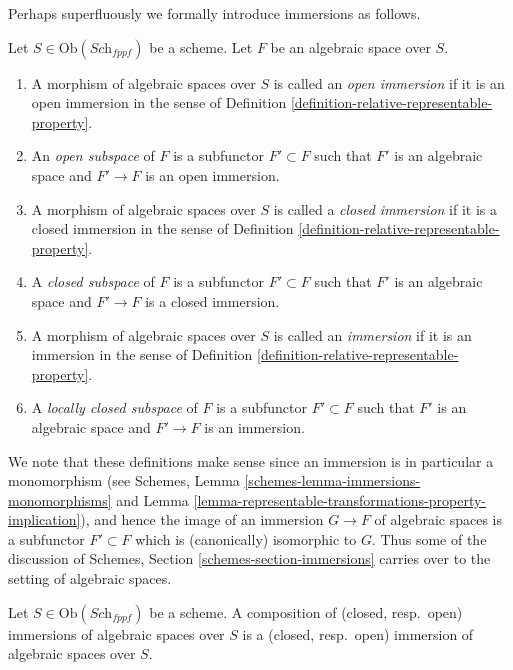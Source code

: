 \medskip\noindent
Perhaps superfluously we formally introduce immersions as follows.

\begin{definition}
\label{definition-immersion}
Let $S \in \text{Ob}(\textit{Sch}_{fppf})$ be a scheme.
Let $F$ be an algebraic space over $S$.
\begin{enumerate}
\item A morphism of algebraic spaces over $S$
is called an {\it open immersion} if it is an open immersion
in the sense of Definition \ref{definition-relative-representable-property}.
\item An {\it open subspace} of $F$ is a subfunctor $F' \subset F$
such that $F'$ is an algebraic space and $F' \to F$ is an
open immersion.
\item A morphism of algebraic spaces over $S$
is called a {\it closed immersion} if it is a closed immersion
in the sense of Definition \ref{definition-relative-representable-property}.
\item A {\it closed subspace} of $F$ is a subfunctor $F' \subset F$
such that $F'$ is an algebraic space and $F' \to F$ is a
closed immersion.
\item A morphism of algebraic spaces over $S$
is called an {\it immersion} if it is an immersion
in the sense of Definition \ref{definition-relative-representable-property}.
\item A {\it locally closed subspace} of $F$ is a subfunctor $F' \subset F$
such that $F'$ is an algebraic space and $F' \to F$ is an
immersion.
\end{enumerate}
\end{definition}

\noindent
We note that these definitions make sense since an immersion
is in particular a monomorphism (see
Schemes, Lemma \ref{schemes-lemma-immersions-monomorphisms}
and Lemma \ref{lemma-representable-transformations-property-implication}),
and hence the image of an
immersion $G \to F$ of algebraic spaces is a subfunctor $F' \subset F$
which is (canonically) isomorphic to $G$. Thus some of the discussion
of Schemes, Section \ref{schemes-section-immersions} carries over to the
setting of algebraic spaces.

\begin{lemma}
\label{lemma-composition-immersions}
Let $S \in \text{Ob}(\textit{Sch}_{fppf})$ be a scheme.
A composition of (closed, resp.\ open) immersions of
algebraic spaces over $S$ is a (closed, resp.\ open)
immersion of algebraic spaces over $S$.
\end{lemma}

